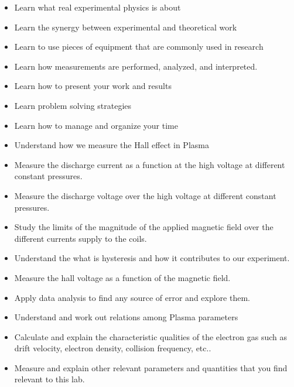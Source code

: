 \documentclass{../lab}
\begin{document}
\begin{itemize}
    \item Learn what real experimental physics is about

    \item Learn the synergy between experimental and theoretical work

    \item Learn to use pieces of equipment that are commonly used in research

    \item Learn how measurements are performed, analyzed, and interpreted.

    \item Learn how to present your work and results

    \item Learn problem solving strategies

    \item Learn how to manage and organize your time

    \item Understand how we measure the Hall effect in Plasma

    \item Measure the discharge current as a function at the high voltage at different constant pressures.

    \item Measure the discharge voltage over the high voltage at different constant pressures.

    \item Study the limits of the magnitude of the applied magnetic field over the different currents supply to the coils.

    \item Understand the what is hysteresis  and how it contributes to our experiment.

    \item Measure the hall voltage as a function of the magnetic field.

    \item Apply data analysis to find any source of error and explore them.

    \item Understand and work out relations among Plasma parameters

    \item Calculate and explain the characteristic qualities of the electron gas such as drift velocity, electron density, collision frequency, etc..

    \item Measure and explain other relevant parameters and quantities that you find relevant to this lab.

\end{itemize}
\end{document}
